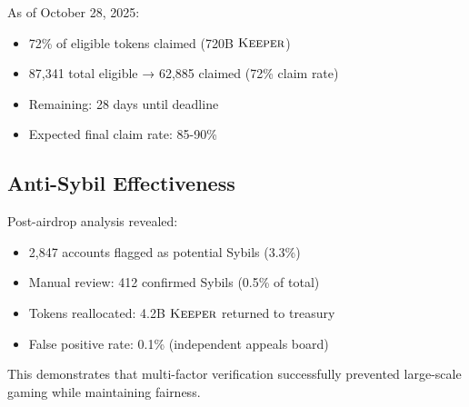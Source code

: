 As of October 28, 2025:
\begin{itemize}
\item 72\% of eligible tokens claimed (720B $\textsc{Keeper}$)
\item 87,341 total eligible → 62,885 claimed (72\% claim rate)
\item Remaining: 28 days until deadline
\item Expected final claim rate: 85-90\%
\end{itemize}

\subsection{Anti-Sybil Effectiveness}

Post-airdrop analysis revealed:
\begin{itemize}
\item 2,847 accounts flagged as potential Sybils (3.3\%)
\item Manual review: 412 confirmed Sybils (0.5\% of total)
\item Tokens reallocated: 4.2B $\textsc{Keeper}$ returned to treasury
\item False positive rate: 0.1\% (independent appeals board)
\end{itemize}

This demonstrates that multi-factor verification successfully prevented large-scale gaming while maintaining fairness.

